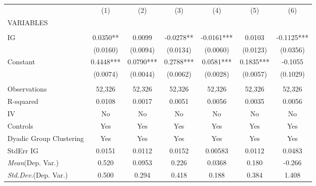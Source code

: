\documentclass[]{article}
\begin{document}
\begin{tabular}{lcccccc} \hline
 & (1) & (2) & (3) & (4) & (5) & (6) \\
VARIABLES &  &  &  &  &  &  \\ \hline
 &  &  &  &  &  &  \\
IG & 0.0350** & 0.0099 & -0.0278** & -0.0161*** & 0.0103 & -0.1125*** \\
 & (0.0160) & (0.0094) & (0.0134) & (0.0060) & (0.0123) & (0.0356) \\
Constant & 0.4448*** & 0.0790*** & 0.2788*** & 0.0581*** & 0.1835*** & -0.1055 \\
 & (0.0074) & (0.0044) & (0.0062) & (0.0028) & (0.0057) & (0.1029) \\
 &  &  &  &  &  &  \\
Observations & 52,326 & 52,326 & 52,326 & 52,326 & 52,326 & 52,326 \\
R-squared & 0.0108 & 0.0017 & 0.0051 & 0.0056 & 0.0035 & 0.0056 \\
IV & No & No & No & No & No & No \\
Controls & Yes & Yes & Yes & Yes & Yes & Yes \\
Dyadic Group Clustering & Yes & Yes & Yes & Yes & Yes & Yes \\
StdErr IG & 0.0151 & 0.0112 & 0.0152 & 0.00583 & 0.0112 & 0.0483 \\
\textit{Mean}(Dep. Var.) & 0.520 & 0.0953 & 0.226 & 0.0368 & 0.180 & -0.266 \\
 \textit{Std.Dev.}(Dep. Var.) & 0.500 & 0.294 & 0.418 & 0.188 & 0.384 & 1.408 \\ \hline
\end{tabular}
\end{document}
